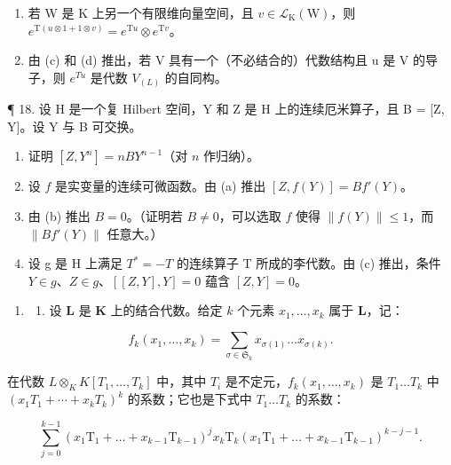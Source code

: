 \begin{enumerate}
\def\labelenumi{(\alph{enumi})}
\setcounter{enumi}{3}
\item
  若 W 是 K 上另一个有限维向量空间，且 \(v \in \mathcal{L}_{\mathrm{K}}(\mathrm{W})\)，则 \(e^{\mathrm{T}(u \otimes 1 + 1 \otimes v)} = e^{\mathrm{T}u} \otimes e^{\mathrm{T}v}\)。
\item
  由 (c) 和 (d) 推出，若 V 具有一个（不必结合的）代数结构且 u 是 V 的导子，则 \(e^{Tu}\) 是代数 \(V_{(L)}\) 的自同构。
\end{enumerate}

¶ 18. 设 H 是一个复 Hilbert 空间，Y 和 Z 是 H 上的连续厄米算子，且 B = {[}Z, Y{]}。设 Y 与 B 可交换。

\begin{enumerate}
\def\labelenumi{(\alph{enumi})}
\item
  证明 \([Z, Y^n] = nBY^{n-1}\)（对 \(n\) 作归纳）。
\item
  设 \(f\) 是实变量的连续可微函数。由 (a) 推出 \([Z, f(Y)] = Bf'(Y)\)。
\item
  由 (b) 推出 \(B = 0\)。（证明若 \(B \neq 0\)，可以选取 \(f\) 使得 \(\| f(Y) \| \leqslant 1\)，而 \(\| Bf'(Y) \|\) 任意大。）
\item
  设 g 是 H 上满足 \(T^{*} = -T\) 的连续算子 T 所成的李代数。由 (c) 推出，条件 \(Y \in g\)、\(Z \in g\)、\([[Z, Y], Y] = 0\) 蕴含 \([Z, Y] = 0\)。
\end{enumerate}

\begin{enumerate}
\def\labelenumi{\arabic{enumi}.}
\setcounter{enumi}{18}
\tightlist
\item
  \begin{enumerate}
  \def\labelenumii{(\alph{enumii})}
  \tightlist
  \item
    设 \(\mathbf{L}\) 是 \(\mathbf{K}\) 上的结合代数。给定 \(k\) 个元素 \(x_{1},\ldots ,x_{k}\) 属于 \(\mathbf{L}\)，记：
  \end{enumerate}
\end{enumerate}

\[
f _ {k} (x _ {1}, \dots , x _ {k}) = \sum_ {\sigma \in \mathfrak {S}_{k}} x _ {\sigma (1)} \dots x _ {\sigma (k)}.
\]

在代数 \(L \otimes_{K} K[T_{1}, \ldots, T_{k}]\) 中，其中 \(T_{i}\) 是不定元，\(f_{k}(x_{1}, \ldots, x_{k})\) 是 \(T_{1} \ldots T_{k}\) 中 \((x_{1}T_{1} + \cdots + x_{k}T_{k})^{k}\) 的系数；它也是下式中 \(T_{1} \ldots T_{k}\) 的系数：

\[
\sum_ {j = 0} ^ {k - 1} \left(x _ {1} \mathrm{T} _ {1} + \dots + x _ {k - 1} \mathrm{T} _ {k - 1}\right) ^ {j} x _ {k} \mathrm{T} _ {k} \left(x _ {1} \mathrm{T} _ {1} + \dots + x _ {k - 1} \mathrm{T} _ {k - 1}\right) ^ {k - j - 1}.
\]

